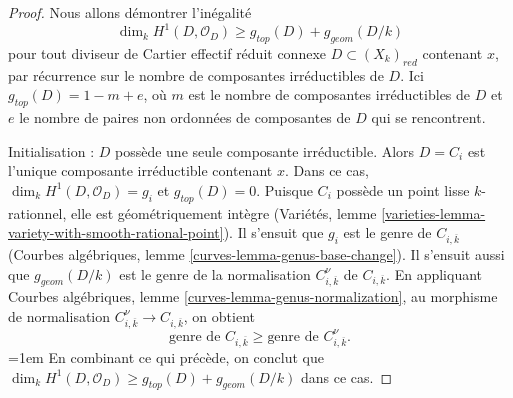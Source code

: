 \begin{proof}
Nous allons démontrer l'inégalité
$$
\dim_k H^1(D, \mathcal{O}_D) \geq g_{top}(D) + g_{geom}(D/k)
$$
pour tout diviseur de Cartier effectif réduit connexe
$D \subset (X_k)_{red}$ contenant $x$, par récurrence sur le nombre de
composantes irréductibles de $D$.
Ici $g_{top}(D) = 1 - m + e$, où $m$ est le nombre de composantes
irréductibles de $D$ et $e$ le nombre de paires non ordonnées de composantes
de $D$ qui se rencontrent.

\medskip\noindent
Initialisation : $D$ possède une seule composante irréductible. Alors
$D = C_i$ est l'unique composante irréductible contenant $x$.
Dans ce cas, $\dim_k H^1(D, \mathcal{O}_D) = g_i$ et
$g_{top}(D) = 0$. Puisque $C_i$ possède un point lisse $k$-rationnel,
elle est géométriquement intègre (Variétés, lemme
\ref{varieties-lemma-variety-with-smooth-rational-point}). Il s'ensuit que
$g_i$ est le genre de $C_{i, \overline{k}}$ (Courbes algébriques, lemme
\ref{curves-lemma-genus-base-change}). Il s'ensuit aussi que
$g_{geom}(D/k)$ est le genre de la normalisation
$C_{i, \overline{k}}^\nu$ de $C_{i, \overline{k}}$. En appliquant Courbes
algébriques, lemme \ref{curves-lemma-genus-normalization}, au morphisme de
normalisation $C_{i, \overline{k}}^\nu \to C_{i, \overline{k}}$, on obtient
\begin{equation}
\label{equation-genus-change-special-component}
\text{genre de }C_{i, \overline{k}} \geq
\text{genre de }C_{i, \overline{k}}^\nu.
\end{equation}
\begingroup
\emergencystretch=1em
En combinant ce qui précède, on conclut que
$\dim_k H^1(D, \mathcal{O}_D) \geq g_{top}(D) + g_{geom}(D/k)$
dans ce cas.
\par
\endgroup


\end{proof}
